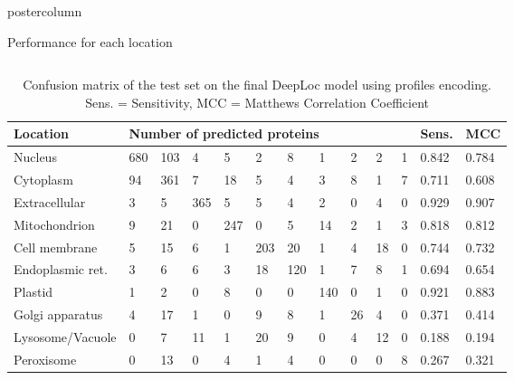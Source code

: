\documentclass[final,hyperref={pdfpagelabels=false}]{beamer}
\begin{document}
\begin{frame}
\begin{columns}
\begin{column}{.49\paperwidth}
\begin{beamercolorbox}[center,wd=\textwidth]{postercolumn}
\begin{minipage}[T]{.99\textwidth}
{

\vfill

\begin{block}{Performance for each location}

\begin{columns}
\begin{column}{1\textwidth}

\centering

\centering
\begin{minipage}[t]{.95\textwidth}


\vspace{-1cm}
\begin{table}[h]
\small
\caption{Confusion matrix of the test set on the final DeepLoc model using profiles encoding. Sens. = Sensitivity, MCC = Matthews Correlation Coefficient}
\begin{tabular}{p{8cm}p{2cm}p{2cm}p{2cm}p{2cm}p{2cm}p{2cm}p{2cm}p{2cm}p{2cm}p{2cm}p{2.5cm}p{2.5cm}}
\toprule
Location      & \multicolumn{10}{l}{Number of predicted proteins}        & Sens. & MCC \\
\midrule
Nucleus          & 680 & 103 & 4   & 5   & 2   & 8   & 1   & 2  & 2 & 1 & 0.842 & 0.784 \\
Cytoplasm         & 94  & 361 &  7  & 18  & 5   & 4   & 3   & 8  & 1 & 7 & 0.711 & 0.608 \\
Extracellular    & 3   & 5   & 365 &  5  & 5   & 4   & 2   & 0  & 4 & 0 & 0.929 & 0.907 \\
Mitochondrion     & 9   & 21  & 0   & 247 &  0  & 5   & 14  & 2  & 1 & 3 & 0.818 & 0.812 \\
Cell membrane     & 5   & 15  & 6   & 1   & 203 & 20  & 1   & 4  & 18& 0 & 0.744 & 0.732 \\
Endoplasmic ret.               & 3   & 6   & 6   & 3   & 18  & 120 &  1  & 7  & 8 & 1 & 0.694 & 0.654 \\
Plastid           & 1   & 2   & 0   & 8   & 0   & 0   & 140 &  0 & 1 & 0 & 0.921 & 0.883 \\
Golgi apparatus  & 4   & 17  & 1   & 0   & 9   & 8   & 1   & 26 & 4 & 0 & 0.371 & 0.414 \\
Lysosome/Vacuole & 0   & 7   & 11  & 1   & 20  & 9   & 0   & 4  & 12& 0 & 0.188 & 0.194 \\
Peroxisome       & 0   & 13  & 0   & 4   & 1   & 4   & 0   & 0  & 0 & 8 & 0.267 & 0.321 \\
\bottomrule


\end{tabular}
\end{table}
\end{minipage}
\end{column}
\end{columns}
\end{block}}
\end{minipage}
\end{beamercolorbox}
\end{column}
\end{columns}
\end{frame}
\end{document}
